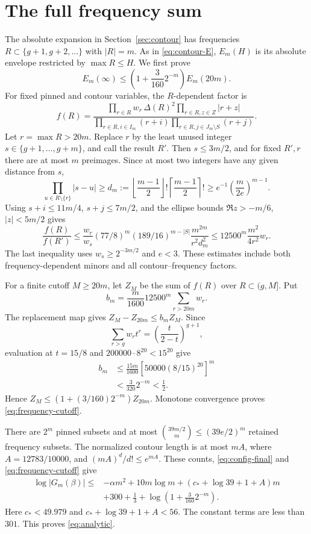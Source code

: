 \section{The full frequency sum}\label{sec:frequency}

The absolute expansion in Section~\ref{sec:contour} has frequencies
$R\subset\{g+1,g+2,\ldots\}$ with $|R|=m$. As in \eqref{eq:contour-E},
$E_m(H)$ is its absolute envelope restricted by $\max R\le H$. We first
prove
\begin{equation}\label{eq:frequency-cutoff}
 E_m(\infty)\le\left(1+\frac3{160}2^{-m}\right)E_m(20m).
\end{equation}
For fixed pinned and contour variables, the $R$-dependent factor is
\[
 f(R)=
 \frac{\prod_{r\in R}w_r\,\Delta(R)^2
       \prod_{r\in R,z\in Z}|r+z|}
      {\prod_{r\in R,i\in I_m}(r+i)
       \prod_{r\in R,j\in J_m\setminus S}(r+j)}.
\]
Let $r=\max R>20m$. Replace $r$ by the least unused integer
$s\in\{g+1,\ldots,g+m\}$, and call the result $R'$. Then $s\le3m/2$, and for fixed
$R',r$ there are at most $m$ preimages. Since at most two integers have
any given distance from $s$,
\[
 \prod_{u\in R\setminus\{r\}}|s-u|\ge
 d_m:=\left\lfloor\frac{m-1}{2}\right\rfloor!
      \left\lceil\frac{m-1}{2}\right\rceil!
 \ge e^{-1}\left(\frac{m}{2e}\right)^{m-1}.
\]
Using $s+i\le11m/4$, $s+j\le7m/2$, and the ellipse bounds
$\Re z>-m/6$, $|z|<5m/2$ gives
\[
 \frac{f(R)}{f(R')}
 \le\frac{w_r}{w_s}(77/8)^m(189/16)^{m-|S|}
       \frac{m^{2m}}{r^2d_m^2}
 \le12500^m\frac{m^2}{4r^2}w_r.
\]
The last inequality uses $w_s\ge2^{-3m/2}$ and $e<3$. These estimates
include both frequency-dependent minors and all contour--frequency factors.

For a finite cutoff $M\ge20m$, let $Z_M$ be the sum of $f(R)$ over
$R\subset(g,M]$. Put
\[
 b_m=\frac{m}{1600}12500^m\sum_{r>20m}w_r.
\]
The replacement map gives $Z_M-Z_{20m}\le b_mZ_M$. Since
\[
 \sum_{r>g}w_rt^r=\left(\frac{t}{2-t}\right)^{g+1},
\]
evaluation at $t=15/8$ and $200000\cdot8^{20}<15^{20}$ give
\[
\begin{aligned}
 b_m&\le\frac{15m}{1600}
       \left[50000(8/15)^{20}\right]^m\\
    &<\frac3{320}2^{-m}<\frac12.
\end{aligned}
\]
Hence $Z_M\le(1+(3/160)2^{-m})Z_{20m}$. Monotone convergence proves
\eqref{eq:frequency-cutoff}.

There are $2^m$ pinned subsets and at most
$\binom{39m/2}{m}\le(39e/2)^m$ retained frequency subsets. The normalized
contour length is at most $mA$, where $A=12783/10000$, and
$(mA)^d/d!\le e^{mA}$. These counts, \eqref{eq:config-final} and
\eqref{eq:frequency-cutoff} give
\[
\begin{aligned}
 \log|G_m(\beta)|\le{}&
 -\alpha m^2+10m\log m+(c_*+\log39+1+A)m\\
 &+300+\tfrac13+\log\left(1+\frac3{160}2^{-m}\right).
\end{aligned}
\]
Here $c_*<49.979$ and $c_*+\log39+1+A<56$. The constant terms are less
than $301$. This proves \eqref{eq:analytic}.
